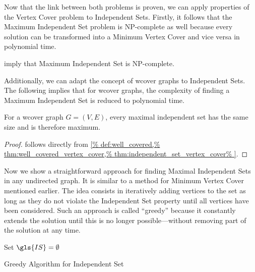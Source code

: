 Now that the link between both problems is proven, we can apply 
properties of the Vertex Cover problem to Independent Sets. Firstly,
it follows that the Maximum Independent Set problem is NP-complete as 
well because every solution can be transformed into a Minimum Vertex
Cover and vice versa in polynomial time.

\begin{theorem}
  \label{thm:maximum_independent_set_complexity}
   imply that Maximum Independent Set
  is NP-complete.
\end{theorem}

Additionally, we can adapt the concept of \gls{wcover} graphs to
Independent Sets. The following
 implies that for
\gls{wcover} graphs, the complexity of finding a Maximum Independent
Set is reduced to polynomial time.

\begin{theorem}
  \label{thm:well_covered_independent_set}
  For a \gls{wcover} graph \(G=(V,E)\), every maximal independent set
  has the same size and is therefore maximum.
\end{theorem}

\begin{proof}
   follows directly from
  \cref{%
    def:well_covered,%
    thm:well_covered_vertex_cover,%
    thm:independent_set_vertex_cover%
  }.
\end{proof}

Now we show a straightforward approach for finding Maximal Independent
Sets in any undirected graph. It is similar to a method for Minimum
Vertex Cover mentioned earlier. The idea consists in iteratively
adding vertices to the set as long as they do not violate the
Independent Set property until all vertices have been considered. Such
an approach is called ``greedy'' because it constantly extends the
solution until this is no longer possible---without removing part of
the solution at any time.

\begin{algorithm}
  \DontPrintSemicolon
  
  
  Set \(\gls{IS} = \emptyset\) \;
  \caption{\label{alg:greedy_independent_set}Greedy Algorithm for Independent Set}
\end{algorithm}

